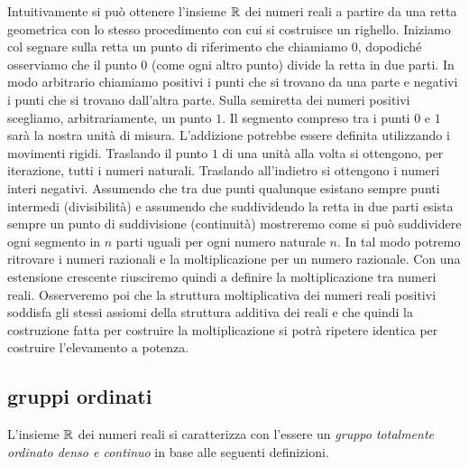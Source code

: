 Intuitivamente si può ottenere l'insieme ${\mathbb R}$ dei numeri reali
a partire da una retta geometrica 
con lo stesso procedimento con cui si costruisce un righello.
Iniziamo col segnare
sulla retta un punto di riferimento che chiamiamo $0$, 
dopodiché osserviamo che
il punto $0$ (come ogni altro punto) divide la retta in due parti. In modo arbitrario
chiamiamo positivi i punti che si trovano da una parte e negativi i punti che
si trovano dall'altra parte. Sulla semiretta dei numeri positivi scegliamo, arbitrariamente,
un punto $1$. Il segmento compreso tra i punti $0$ e $1$ sarà la nostra unità di
misura.
L'addizione potrebbe essere definita utilizzando i movimenti rigidi.
Traslando il punto $1$ di una unità alla volta si ottengono, per iterazione, tutti i numeri naturali.
Traslando all'indietro si ottengono i numeri interi negativi. 
Assumendo che tra due punti qualunque esistano sempre punti intermedi (divisibilità) e
assumendo che suddividendo la retta in due parti esista sempre un punto di 
suddivisione (continuità) mostreremo come si può suddividere 
ogni segmento in $n$ parti uguali per ogni numero naturale $n$. 
In tal modo potremo ritrovare i numeri razionali e la moltiplicazione per un numero razionale.
Con una estensione crescente riusciremo quindi a definire la moltiplicazione 
tra numeri reali. 
Osserveremo poi che la struttura moltiplicativa dei numeri reali positivi soddisfa 
gli stessi assiomi della struttura additiva dei reali e che quindi la costruzione fatta 
per costruire la moltiplicazione si potrà ripetere identica per costruire l'elevamento a potenza.

\subsection{gruppi ordinati}

L'insieme ${\mathbb R}$ dei numeri reali si caratterizza 
con l'essere un \emph{gruppo totalmente ordinato denso e continuo}
in base alle seguenti definizioni.

